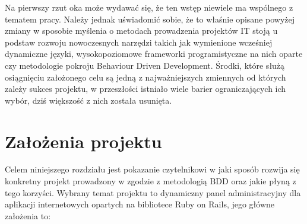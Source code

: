   Na pierwszy rzut oka może wydawać się, że ten wstęp niewiele ma wspólnego z tematem pracy. Należy jednak uświadomić sobie, że to właśnie opisane powyżej zmiany w sposobie myślenia o metodach prowadzenia projektów IT stoją u podstaw rozwoju nowoczesnych narzędzi takich jak wymienione wcześniej dynamiczne języki, wysokopoziomowe frameworki programistyczne na nich oparte czy metodologie pokroju Behaviour Driven Development. Środki, które służą osiągnięciu założonego celu są jedną z najważniejszych zmiennych od których zależy sukces projektu, w przeszłości istniało wiele barier ograniczających ich wybór, dziś większość z nich została usunięta.
  
  \section{Założenia projektu}
  Celem niniejszego rozdziału jest pokazanie czytelnikowi w jaki sposób rozwija się konkretny projekt prowadzony w zgodzie z metodologią BDD oraz jakie płyną z tego korzyści. Wybrany temat projektu to dynamiczny panel administracyjny dla aplikacji internetowych opartych na bibliotece Ruby on Rails, jego główne założenia to:
  
